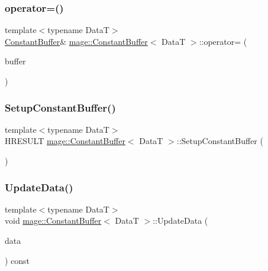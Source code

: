 \subsubsection{\texorpdfstring{operator=()}{operator=()}\hspace{0.1cm}{\footnotesize\ttfamily [2/2]}}
{\footnotesize\ttfamily template$<$typename DataT$>$ \\
\hyperlink{structmage_1_1_constant_buffer}{Constant\+Buffer}\& \hyperlink{structmage_1_1_constant_buffer}{mage\+::\+Constant\+Buffer}$<$ DataT $>$\+::operator= (\begin{DoxyParamCaption}\item[{\hyperlink{structmage_1_1_constant_buffer}{Constant\+Buffer}$<$ DataT $>$ \&\&}]{buffer }\end{DoxyParamCaption})\hspace{0.3cm}{\ttfamily [delete]}}

\hypertarget{structmage_1_1_constant_buffer_a7fc18ea6b686aa7a1bcdb964dfe465dd}{}\label{structmage_1_1_constant_buffer_a7fc18ea6b686aa7a1bcdb964dfe465dd} 
\subsubsection{\texorpdfstring{Setup\+Constant\+Buffer()}{SetupConstantBuffer()}}
{\footnotesize\ttfamily template$<$typename DataT$>$ \\
H\+R\+E\+S\+U\+LT \hyperlink{structmage_1_1_constant_buffer}{mage\+::\+Constant\+Buffer}$<$ DataT $>$\+::Setup\+Constant\+Buffer (\begin{DoxyParamCaption}{ }\end{DoxyParamCaption})\hspace{0.3cm}{\ttfamily [private]}}

\hypertarget{structmage_1_1_constant_buffer_a535429ca9cf81b44907b581324854392}{}\label{structmage_1_1_constant_buffer_a535429ca9cf81b44907b581324854392} 
\subsubsection{\texorpdfstring{Update\+Data()}{UpdateData()}}
{\footnotesize\ttfamily template$<$typename DataT$>$ \\
void \hyperlink{structmage_1_1_constant_buffer}{mage\+::\+Constant\+Buffer}$<$ DataT $>$\+::Update\+Data (\begin{DoxyParamCaption}\item[{const DataT \&}]{data }\end{DoxyParamCaption}) const}



